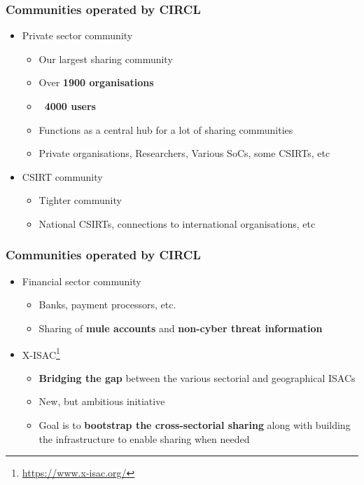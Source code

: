 \begin{frame}
\frametitle{Communities operated by CIRCL}
\begin{itemize}
        \item Private sector community
	\begin{itemize}
		\item Our largest sharing community
		\item Over {\bf 1900 organisations}
		\item {\bf ~4000 users}
		\item Functions as a central hub for a lot of sharing communities
		\item Private organisations, Researchers, Various SoCs, some CSIRTs, etc
	\end{itemize}
	\item CSIRT community
	\begin{itemize}
		\item Tighter community
		\item National CSIRTs, connections to international organisations, etc
	\end{itemize}
\end{itemize}
\end{frame}

\begin{frame}
\frametitle{Communities operated by CIRCL}
\begin{itemize}
	\item Financial sector community
	\begin{itemize}
		\item Banks, payment processors, etc.
		\item Sharing of {\bf mule accounts} and {\bf non-cyber threat information}
	\end{itemize}
    \item X-ISAC\footnote{\url{https://www.x-isac.org/}}
	\begin{itemize}
		\item {\bf Bridging the gap} between the various sectorial and geographical ISACs
		\item New, but ambitious initiative
		\item Goal is to {\bf bootstrap the cross-sectorial sharing} along with building the infrastructure to enable sharing when needed
	\end{itemize}
\end{itemize}
\end{frame}

